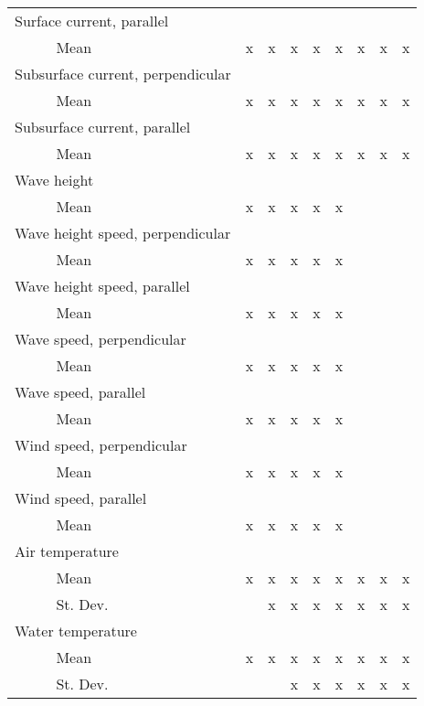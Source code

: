 \begin{table}
{\begin{minipage}{\textwidth}
\begin{tabular}{ll|cccccccc}
        \hline
        \multicolumn{2}{l|}{Surface current, parallel} &&&&&&&& \\
        & Mean & x & x & x & x & x & x & x & x \\
        \hline
        \multicolumn{2}{l|}{Subsurface current, perpendicular} &&&&&&&& \\
        & Mean & x & x & x & x & x & x & x & x \\
        \hline
        \multicolumn{2}{l|}{Subsurface current, parallel} &&&&&&&& \\
        & Mean & x & x & x & x & x & x & x & x \\
        \hline
        \multicolumn{2}{l|}{Wave height} &&&&&&&& \\
        & Mean & x & x & x & x & x &  &  &  \\
        \hline
        \multicolumn{2}{l|}{Wave height speed, perpendicular} &&&&&&&& \\
        & Mean & x & x & x & x & x & & & \\
        \hline
        \multicolumn{2}{l|}{Wave height speed, parallel} &&&&&&&& \\
        & Mean & x & x & x & x & x & & & \\
        \hline
        \multicolumn{2}{l|}{Wave speed, perpendicular} &&&&&&&& \\
        & Mean & x & x & x & x & x & & & \\
        \hline
        \multicolumn{2}{l|}{Wave speed, parallel} &&&&&&&& \\
        & Mean & x & x & x & x & x & & & \\
        \hline
        \multicolumn{2}{l|}{Wind speed, perpendicular} &&&&&&&& \\
        & Mean & x & x & x & x & x & & & \\
        \hline
        \multicolumn{2}{l|}{Wind speed, parallel} &&&&&&&& \\
        & Mean & x & x & x & x & x & & & \\
        \hline
        \multicolumn{2}{l|}{Air temperature} &&&&&&&& \\
        & Mean & x & x & x & x & x & x & x & x \\
        & St. Dev. & & x & x & x & x & x & x & x \\
        \hline
        \multicolumn{2}{l|}{Water temperature} &&&&&&&& \\
        & Mean & x & x & x & x & x & x & x & x \\
        & St. Dev. & & & x & x & x & x & x & x \\

\end{tabular}
\end{minipage}}
\end{table}
